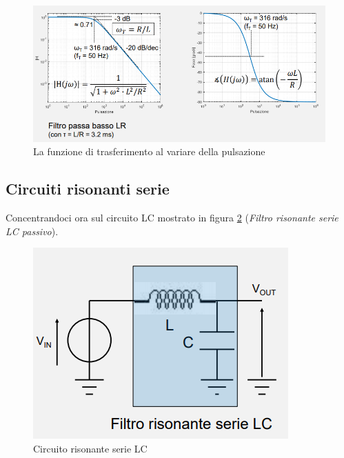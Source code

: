 \documentclass{article}
\begin{document}
\begin{figure}[h]
  \centering
  \includegraphics[scale=0.7]{IM_circuito_LR_passivo_grafici}
  \caption{La funzione di trasferimento al variare della pulsazione}
  \label{Schema_circuito_LR_passivo_grafici}
\end{figure}

\clearpage










\subsection{Circuiti risonanti serie}

Concentrandoci ora sul circuito LC mostrato in figura \ref{Schema_circuito_risonante_serie_LC} (\textit{Filtro risonante serie LC passivo}).

\begin{figure}[h]
  \centering
  \includegraphics[scale=0.5]{IM_circuito_risonante_serie_LC}
  \caption{Circuito risonante serie LC}
  \label{Schema_circuito_risonante_serie_LC}
\end{figure}
\end{document}

